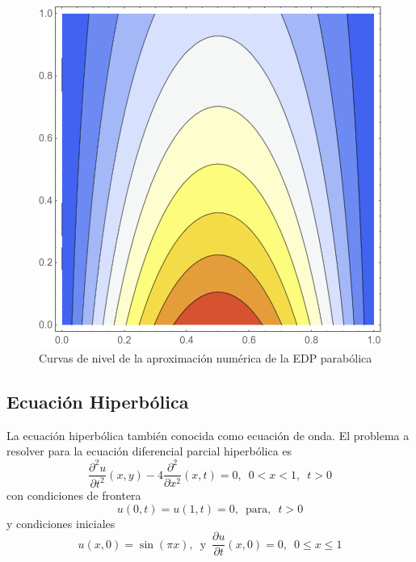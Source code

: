 \documentclass[a4paper]{article}
\begin{document}
\begin{figure}[H]
\begin{center}
\includegraphics[scale=0.29]{./parabolic_contour.png} 
\end{center} 
\caption{Curvas de nivel de la aproximación numérica de la EDP parabólica}
\label{fig::fig6}
\end{figure}



\subsection{Ecuación Hiperbólica}
La ecuación hiperbólica también conocida como ecuación de onda. El problema a resolver para la ecuación diferencial parcial hiperbólica es 
\begin{equation} \label{eq::wave_equation}
\frac{\partial^2 u}{\partial t^2}(x,y)-4\frac{\partial ^2}{\partial x^2}(x,t)=0,\,\,\,0<x<1,\,\,\,t>0
\end{equation}
con condiciones de frontera 
\begin{equation}
u(0,t)=u(1,t)=0,\,\,\, \text{para, }\,\,t>0
\end{equation}
y condiciones iniciales
\begin{equation}
u(x,0)=\sin(\pi x), \,\,\, \text{y}\,\,\,\frac{\partial u}{\partial t}(x,0)=0,\,\,\, 0\leq x \leq 1
\end{equation}
\end{document}
